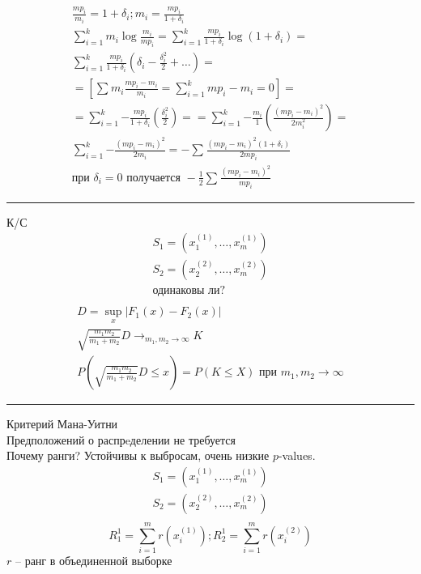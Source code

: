 \documentclass{book}
\begin{document}
\begin{gather*}
  \frac{mp_i}{m_i}=1+\delta_i; m_i=\frac{mp_i}{1+\delta_i}\\
  \sum_{i=1}^{k} {m_i\log\frac{m_i}{mp_i}} = \sum_{i=1}^{k} {\frac{mp_i}{1+\delta_i}\log(1+\delta_i)}=\\
  \sum_{i=1}^{k} {\frac{mp_i}{1+\delta_i}(\delta_i-\frac{\delta_i^2}{2}+\dots)}=\\
  =\left[\sum_{}^{} {m_i\frac{mp_i-m_i}{m_i}=\sum_{i=1}^{k} {mp_i-m_i}}=0\right]=\\
  =\sum_{i=1}^{k} {-\frac{mp_i}{1+\delta_i}\left(\frac{\delta_i^2}{2}\right)}=
  =\sum_{i=1}^{k} {-\frac{m_i}{1}\left(\frac{\left(mp_i-m_i\right)^2}{2m_i^2}\right)}=\\
  \sum_{i=1}^{k} {-\frac{(mp_i-m_i)^2}{2m_i}}=-\sum_{}^{} {\frac{(mp_i-m_i)^2(1+\delta_i)}{2mp_i}}\\
  \textrm{при }\delta_i=0\textrm{ получается } -\frac{1}{2}\sum_{}^{} {\frac{(mp_i-m_i)^2}{mp_i}}
\end{gather*}
\hrule
К/С
\begin{gather*}
  S_1=(x_1^{(1)}, \dots, x_m^{(1)})\\
  S_2=(x_2^{(2)}, \dots, x_m^{(2)})\\
  \textrm{одинаковы ли?}\\
\end{gather*}
\begin{gather*}
  D=\sup_x |F_1(x)-F_2(x)|\\
  \sqrt{\frac{m_1m_2}{m_1+m_2}}D\rightarrow_{m_1,m_2\rightarrow\infty}K\\
  P \left(\sqrt{\frac{m_1m_2}{m_1+m_2}}D\leq x\right) = P(K\leq X) \textrm{ при }m_1, m_2\rightarrow \infty
\end{gather*}
\hrule
Критерий Мана-Уитни\\
Предположений о распрeделении не требуется\\
Почему ранги? Устойчивы к выбросам, очень низкие $p$-values.\\

\begin{gather*}
  S_1=(x_1^{(1)}, \dots, x_m^{(1)})\\
  S_2=(x_2^{(2)}, \dots, x_m^{(2)})\\
\end{gather*}
\[
  R_1^{1}=\sum_{i=1}^{m} {r(x_i^{(1)})};
  R_2^{1}=\sum_{i=1}^{m} {r(x_i^{(2)})}
\]
$r$ -- ранг в объединенной выборке\\
\end{document}
